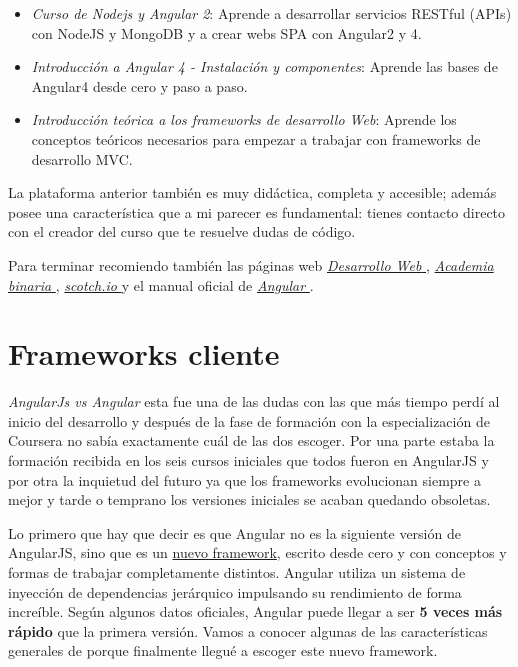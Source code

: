 \begin{itemize}
	\item \emph{Curso de Nodejs y Angular 2}: Aprende a desarrollar servicios RESTful (APIs) con NodeJS y MongoDB y a crear webs SPA con Angular2 y 4. \cite{curso1}
	\item  \emph{Introducción a Angular 4 - Instalación y componentes}: Aprende las bases de Angular4 desde cero y paso a paso. \cite{curso2}
	\item \emph{Introducción teórica a los frameworks de desarrollo Web}: Aprende los conceptos teóricos necesarios para empezar a trabajar con frameworks de desarrollo MVC. \cite{curso3}
\end{itemize}

La plataforma anterior también es muy didáctica, completa y accesible; además posee una característica que a mi parecer es fundamental: tienes contacto directo con el creador del curso que te resuelve dudas de código.

Para terminar recomiendo también las páginas web  \href{https://desarrolloweb.com/manuales/manual-angular-2.html}{\emph{Desarrollo Web }} \cite{desarrollo1} \cite{desarrollo2}, \href{http://academia-binaria.com/}{\emph{Academia binaria }} \cite{academia2}, \href{https://scotch.io/}{\emph{scotch.io }}  \cite{scotch1} y el manual oficial de \href{https://angular.io/docs/}{\emph{Angular }} .




 \section{Frameworks cliente}\label{cliente}
 
 \emph{AngularJs vs Angular } esta fue una de las dudas con las que más tiempo perdí al inicio del desarrollo y después de la fase de formación con la especialización de Coursera no sabía exactamente cuál de las dos escoger. Por una parte estaba la formación recibida en los seis cursos iniciales que todos fueron en AngularJS y por otra la inquietud del futuro ya que los frameworks evolucionan siempre a mejor y tarde o temprano los versiones iniciales se acaban quedando obsoletas. 
 
 Lo primero que hay que decir es que Angular no es la siguiente versión de AngularJS, sino que es un \underline{nuevo framework}, escrito desde cero y con conceptos y formas de trabajar completamente distintos. Angular utiliza un sistema de inyección de dependencias jerárquico impulsando su rendimiento de forma increíble.  Según algunos datos oficiales, Angular puede llegar a ser \textbf{5 veces más rápido} que la primera versión.  Vamos a conocer algunas de las características generales de porque finalmente llegué a escoger este nuevo framework. 
 
